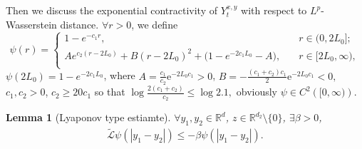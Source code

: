 \documentclass[11pt,reqno]{amsart}
\newtheorem{lemma}{\indent Lemma}[section]
\numberwithin{equation}{section}
\newcommand{\R}{\mathbb{R}}
\begin{document}
Then we discuss the exponential contractivity of $Y_t^{x,y}$ with respect to $L^p$-Wasserstein distance.
$\forall r>0$, we define
$$\psi(r)=
\begin{cases}
	1-e^{-c_1r}, & \quad r\in(0,2L_0];\\
	Ae^{c_2(r-2L_0)}+B(r-2L_0)^2+ \bigl(1-e^{-2c_1L_0}-A
	\bigr), & \quad r\in [2L_0,\infty),\\
\end{cases}$$
$\psi(2L_0)=1-e^{-2c_1L_0}$, where
$A= \frac{c_1}{c_2}\mathrm{e}^{-2L_0c_1}>0$, $B= -\frac{(c_1+c_2)c_1}{2}\mathrm{e}^{-2L_0c_1}<0,$
$c_1,c_2>0$, $c_2\ge20c_1$ so that
$\log\frac{2(c_1+c_2)}{c_2}\le\log2.1,$ obviously  $\psi\in
C^2\left([0,\infty)\right)$. 

\begin{lemma}[Lyaponov type estiamte]\label{inv-gen-L} $\forall y_1, y_2\in\mathbb{R}^d$,  $ z\in\R^{d_2}\setminus\{0\}$, $\exists \beta>0$,
\begin{align*}	\widetilde{\mathcal{L}}\psi(|y_1-y_2|)\leq-\beta\psi(|y_1-y_2|).
\end{align*}
\end{lemma}
\end{document}
